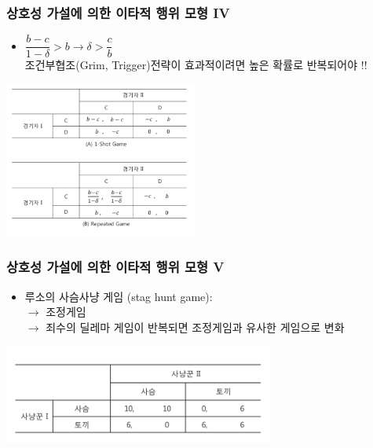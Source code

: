 \documentclass[final]{beamer}
\begin{document}
\begin{frame}\frametitle{상호성 가설에 의한 이타적 행위 모형 IV}%
\begin{itemize}\large
\item $\dfrac{b-c}{1-\delta} > b \rightarrow \delta > \dfrac{c}{b} $ \\
조건부협조(Grim, Trigger)전략이 효과적이려면 높은 확률로 반복되어야 !!
\end{itemize}
\begin{center}
\includegraphics[width=2.5in]{repeat01.png}  
\end{center}
\end{frame}

\begin{frame}\frametitle{상호성 가설에 의한 이타적 행위 모형 V}%
\begin{itemize}\large
\item 루소의 사슴사냥 게임 (stag hunt game): \\ 
\color{blue} $\rightarrow$ 조정게임 \\
\color{blue} $\rightarrow$ 죄수의 딜레마 게임이 반복되면 조정게임과 유사한 게임으로 변화 \\
\end{itemize}
\begin{center}
\includegraphics[width=3.5in]{staghunt01.png}
\end{center}
\end{frame}
\end{document}
